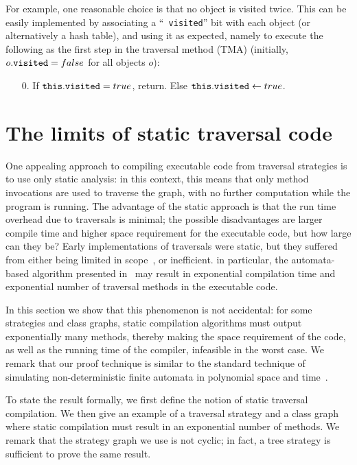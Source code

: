 For example, one reasonable choice is that no object is visited
twice. This can be easily implemented by associating a ``{\tt
visited}'' bit with each object (or alternatively a hash table), and
using it as expected, namely to execute the following as the first
step in the traversal method (TMA) (initially, $o.\mbox{\tt
visited}={\sc false}$ for all objects $o$):

\begin{enumerate}
\item[0.] 
If ${\tt this}.\mbox{\tt visited}={\sc true}$, return. 
Else ${\tt this}.\mbox{\tt visited}\gets{\sc true}$.
\end{enumerate}

\section{The limits of static traversal code}
\label{sec-lb}
One appealing approach to compiling executable code from traversal
strategies is to use only static analysis: in this context, this means
that only method invocations are used to traverse the graph, with no
further computation while the program is running. The advantage of the
static approach is that the run time overhead due to traversals is
minimal; the possible disadvantages are larger compile time and higher
space requirement for the executable code, but how large can they be?
Early implementations of traversals were static, but they suffered
from either being limited in scope~\cite{lieber-palsberg-xiao94,
gener-comp-j:jens-boaz-karl}, or inefficient.  in particular, the
automata-based algorithm presented
in~\cite{gener-comp-j:jens-boaz-karl} may result in exponential
compilation time and exponential number of traversal methods in the
executable code.

In this section we show that this phenomenon is not accidental: for
some strategies and class graphs, static compilation algorithms must
output exponentially many methods, thereby making the space
requirement of the code, as well as the running time of the compiler,
infeasible in the worst case.  We remark that our proof technique is
similar to the standard technique of simulating non-deterministic
finite automata in polynomial space and time~\cite{dragon-nfa-sim}.

To state the result formally, we first define the notion of static
traversal compilation. We then give an example of a traversal strategy
and a class graph where static compilation must result in an
exponential number of methods.  We remark that the strategy graph we
use is not cyclic; in fact, a tree strategy is sufficient to prove the
same result.


